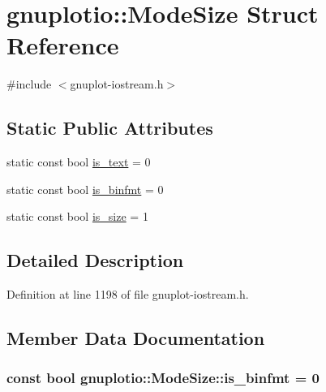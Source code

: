 \hypertarget{structgnuplotio_1_1_mode_size}{}\section{gnuplotio\+:\+:Mode\+Size Struct Reference}
\label{structgnuplotio_1_1_mode_size}


{\ttfamily \#include $<$gnuplot-\/iostream.\+h$>$}

\subsection*{Static Public Attributes}
\begin{DoxyCompactItemize}
\item 
static const bool \hyperlink{structgnuplotio_1_1_mode_size_aa01840f76877ae7c8bad254dae28e32c}{is\+\_\+text} = 0
\item 
static const bool \hyperlink{structgnuplotio_1_1_mode_size_ac5243e8e4910f2f6a2724b9fc0de4ff9}{is\+\_\+binfmt} = 0
\item 
static const bool \hyperlink{structgnuplotio_1_1_mode_size_aa20ae9f1ce222504489db33d13eb46c0}{is\+\_\+size} = 1
\end{DoxyCompactItemize}


\subsection{Detailed Description}


Definition at line 1198 of file gnuplot-\/iostream.\+h.



\subsection{Member Data Documentation}
\subsubsection[{\texorpdfstring{is\+\_\+binfmt}{is_binfmt}}]{\setlength{\rightskip}{0pt plus 5cm}const bool gnuplotio\+::\+Mode\+Size\+::is\+\_\+binfmt = 0\hspace{0.3cm}{\ttfamily [static]}}\hypertarget{structgnuplotio_1_1_mode_size_ac5243e8e4910f2f6a2724b9fc0de4ff9}{}\label{structgnuplotio_1_1_mode_size_ac5243e8e4910f2f6a2724b9fc0de4ff9}


